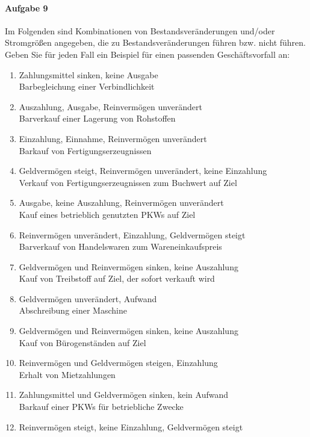 \documentclass[paper=a4, fontsize=11pt]{scrartcl}
\numberwithin{equation}{section}
\numberwithin{figure}{section}
\numberwithin{table}{section}
\begin{document}
\paragraph{Aufgabe 9}
Im Folgenden sind Kombinationen von Bestandsveränderungen und/oder Stromgrößen angegeben, die zu Bestandsveränderungen führen bzw. nicht führen. Geben Sie für jeden Fall ein Beispiel für einen passenden Geschäftsvorfall an: \\
\begin{enumerate}
\item Zahlungsmittel sinken, keine Ausgabe \\
Barbegleichung einer Verbindlichkeit
\item Auszahlung, Ausgabe, Reinvermögen unverändert \\
Barverkauf einer Lagerung von Rohstoffen
\item Einzahlung, Einnahme, Reinvermögen unverändert \\
Barkauf von Fertigungserzeugnissen
\item Geldvermögen steigt, Reinvermögen unverändert, keine Einzahlung \\
Verkauf von Fertigungserzeugnissen zum Buchwert auf Ziel
\item Ausgabe, keine Auszahlung, Reinvermögen unverändert \\
Kauf eines betrieblich genutzten PKWs auf Ziel
\item Reinvermögen unverändert, Einzahlung, Geldvermögen steigt \\
Barverkauf von Handelswaren zum Wareneinkaufspreis
\item Geldvermögen und Reinvermögen sinken, keine Auszahlung \\
Kauf von Treibstoff auf Ziel, der sofort verkauft wird
\item Geldvermögen unverändert, Aufwand \\
Abschreibung einer Maschine
\item Geldvermögen und Reinvermögen sinken, keine Auszahlung \\
Kauf von Bürogenständen auf Ziel
\item Reinvermögen und Geldvermögen steigen, Einzahlung \\
Erhalt von Mietzahlungen
\item Zahlungsmittel und Geldvermögen sinken, kein Aufwand \\
Barkauf einer PKWs für betriebliche Zwecke
\item Reinvermögen steigt, keine Einzahlung, Geldvermögen steigt \\

\end{enumerate}
\end{document}
